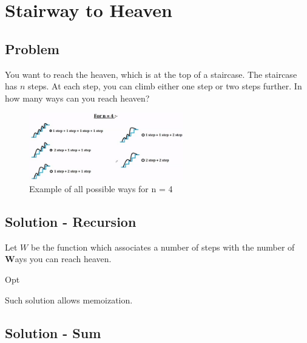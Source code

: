 \section{Stairway to Heaven}

\subsection{Problem}

You want to reach the heaven, which is at the top of a staircase. The staircase has $n$ steps. At each step, you can climb either one step or two steps further. In how many ways can you reach heaven?

\begin{figure}[H]
    \centering
    \includegraphics[width=0.6\textwidth]{./images/stairway_to_heaven_0.jpg}
    \caption{Example of all possible ways for n = 4}
\end{figure}

\subsection{Solution - Recursion}

Let $W$ be the function which associates a number of steps with the number of \textbf{W}ays you can reach heaven.

\begin{algorithm}[H]
    \caption{Opt}
    \label{stairway-to-heaven:algorithm:naive}
    \begin{algorithmic}[1]
    \end{algorithmic}
\end{algorithm}

Such solution allows memoization.

\subsection{Solution - Sum}

